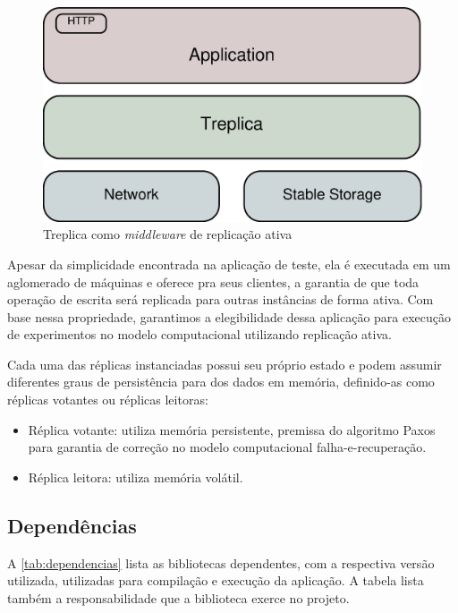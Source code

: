 \begin{figure}[ht]
  \centering
  \includegraphics[width=12cm]{conteudo/capitulos/figuras/block-treplica.eps}
  \caption{Treplica como \emph{middleware} de replicação ativa}
  \label{fig:treplica_como_middleware}
\end{figure}

Apesar da simplicidade encontrada na aplicação de teste, ela é executada em um aglomerado
de máquinas e oferece pra seus clientes, a garantia de que toda operação de escrita será
replicada para outras instâncias de forma ativa. Com base nessa propriedade, garantimos a
elegibilidade dessa aplicação para execução de experimentos no modelo computacional
utilizando replicação ativa.

Cada uma das réplicas instanciadas possui seu próprio estado e podem assumir diferentes
graus de persistência para dos dados em memória, definido-as como réplicas votantes ou
réplicas leitoras:

\begin{itemize}
  \item Réplica votante: utiliza memória persistente, premissa do algoritmo Paxos para
    garantia de correção no modelo computacional falha-e-recuperação.
  \item Réplica leitora: utiliza memória volátil.
\end{itemize}

\subsection{Dependências}

A \autoref{tab:dependencias} lista as bibliotecas dependentes, com a respectiva versão
utilizada, utilizadas para compilação e execução da aplicação. A tabela lista também a
responsabilidade que a biblioteca exerce no projeto.

